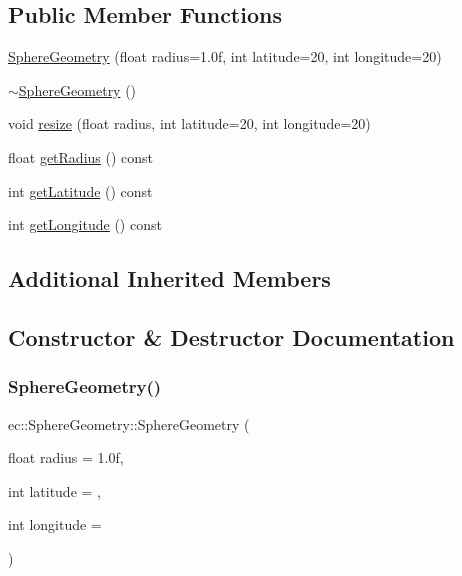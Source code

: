 \subsection*{Public Member Functions}
\begin{DoxyCompactItemize}
\item 
\mbox{\hyperlink{classec_1_1_sphere_geometry_a42ece383849cd3ab23f65a40cdf370af}{Sphere\+Geometry}} (float radius=1.\+0f, int latitude=20, int longitude=20)
\item 
\mbox{\hyperlink{classec_1_1_sphere_geometry_a67044e9d2bb86448165de2ae1c62b7f7}{$\sim$\+Sphere\+Geometry}} ()
\item 
void \mbox{\hyperlink{classec_1_1_sphere_geometry_a44eb0096b6f9c6a98a7c325032c04c41}{resize}} (float radius, int latitude=20, int longitude=20)
\item 
float \mbox{\hyperlink{classec_1_1_sphere_geometry_a297fbaec8341dbb2dd0023b0d90d4e24}{get\+Radius}} () const
\item 
int \mbox{\hyperlink{classec_1_1_sphere_geometry_a44bb07ae4243b721d7542fb8fe30a9a7}{get\+Latitude}} () const
\item 
int \mbox{\hyperlink{classec_1_1_sphere_geometry_a57803f9dc144ba93a300091561a93f07}{get\+Longitude}} () const
\end{DoxyCompactItemize}
\subsection*{Additional Inherited Members}


\subsection{Constructor \& Destructor Documentation}
\mbox{\label{classec_1_1_sphere_geometry_a42ece383849cd3ab23f65a40cdf370af}} 
\subsubsection{\texorpdfstring{Sphere\+Geometry()}{SphereGeometry()}}
{\footnotesize\ttfamily ec\+::\+Sphere\+Geometry\+::\+Sphere\+Geometry (\begin{DoxyParamCaption}\item[{float}]{radius = {\ttfamily 1.0f},  }\item[{int}]{latitude = {},  }\item[{int}]{longitude = {} }\end{DoxyParamCaption})\hspace{0.3cm}{\ttfamily [explicit]}}

